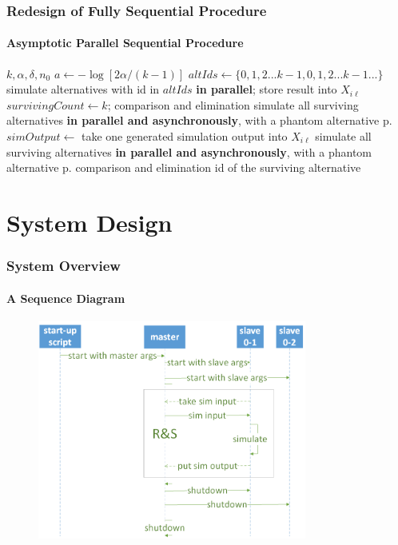 \documentclass{beamer}
\begin{document}
\begin{frame}
\frametitle{Redesign of Fully Sequential Procedure}
\framesubtitle{Asymptotic Parallel Sequential Procedure}
\begin{algorithmic}[1]
\Require $k, \alpha, \delta, n_0$
\State $a \gets - \log{[2\alpha / (k - 1)]}$
\State $altIds \gets \{0, 1, 2...k - 1, 0, 1, 2...k - 1...\}$ 
\State simulate alternatives with id in $altIds$ \textbf{in parallel}; store result into $X_{i\ell}$
\State $survivingCount \gets k$; comparison and elimination
\State simulate all surviving alternatives \textbf{in parallel and asynchronously}, with a phantom alternative p.
  \State $simOutput \gets $ take one generated simulation output into $X_{i\ell}$
    \State simulate all surviving alternatives \textbf{in parallel and asynchronously}, with a phantom alternative p.
    \State comparison and elimination
  \EndIf
\EndWhile
\State \Return id of the surviving alternative
\end{algorithmic}
\end{frame}

\section{System Design}

\begin{frame}
\frametitle{System Overview}
\framesubtitle{A Sequence Diagram}
\begin{figure}[ht]
\centering
\includegraphics[height=72mm]{overview_seq_single.png}
\end{figure}
\end{frame}
\end{document}
